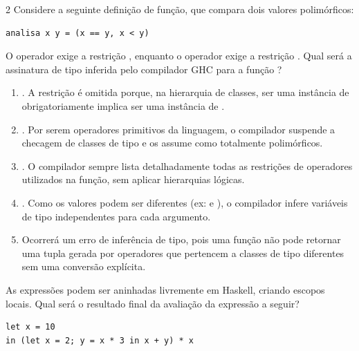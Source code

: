 \documentclass[a4paper,10pt,brazil]{article}
\begin{document}
\begin{multicols}{2}
Considere a seguinte definição de função, que compara dois valores polimórficos:
\begin{verbatim}
analisa x y = (x == y, x < y)
\end{verbatim}
O operador \haskellinline{==} exige a restrição , enquanto o operador \haskellinline{<} exige a restrição . Qual será a assinatura de tipo inferida pelo compilador GHC para a função ?

\begin{enumerate}
  \item {}. A restrição  é omitida porque, na hierarquia de classes, ser uma instância de  obrigatoriamente implica ser uma instância de .

  \item {}. Por serem operadores primitivos da linguagem, o compilador suspende a checagem de classes de tipo e os assume como totalmente polimórficos.

  \item {}. O compilador sempre lista detalhadamente todas as restrições de operadores utilizados na função, sem aplicar hierarquias lógicas.

  \item {}. Como os valores podem ser diferentes (ex:  e ), o compilador infere variáveis de tipo independentes para cada argumento.

  \item Ocorrerá um erro de inferência de tipo, pois uma função não pode retornar uma tupla gerada por operadores que pertencem a classes de tipo diferentes sem uma conversão explícita.


\end{enumerate}

As expressões  podem ser aninhadas livremente em Haskell, criando escopos locais. Qual será o resultado final da avaliação da expressão a seguir?
\begin{verbatim}
let x = 10 
in (let x = 2; y = x * 3 in x + y) * x
\end{verbatim}


\end{multicols}
\end{document}
